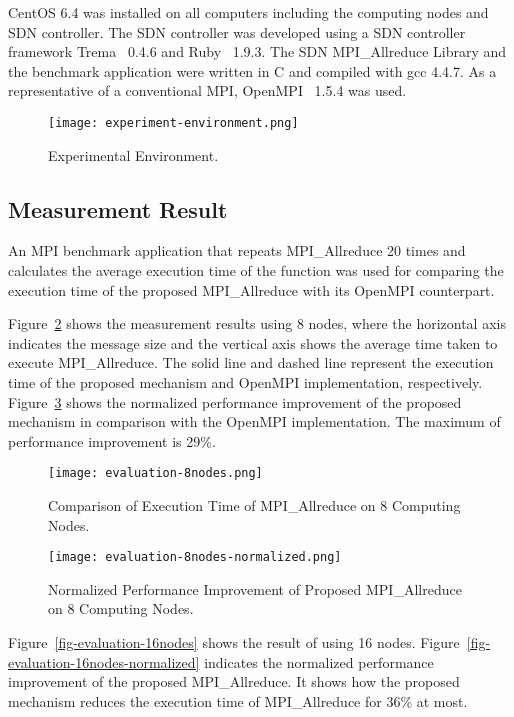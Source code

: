 CentOS 6.4 was installed on all computers including the computing nodes and
SDN controller. The SDN controller was developed using a SDN controller
framework Trema~\autocite{trema} 0.4.6 and Ruby~\autocite{ruby} 1.9.3. The SDN
MPI\_Allreduce Library and the benchmark application were written in C and
compiled with gcc 4.4.7. As a representative of a conventional MPI,
OpenMPI~\autocite{Gabriel2004} 1.5.4 was used.

\begin{figure}
    \centering
    \texttt{[image: experiment-environment.png]}
    \caption{Experimental Environment.}%
    \label{fig-experiment-environment}
\end{figure}

\subsection{Measurement Result}

An MPI benchmark application that repeats MPI\_Allreduce 20
times and calculates the average execution time of the function was used
for comparing the execution time of the proposed MPI\_Allreduce
with its OpenMPI counterpart.

Figure~\ref{fig-evaluation-8nodes} shows the measurement results using 8
nodes, where the horizontal axis indicates the message size and the
vertical axis shows the average time taken to execute
MPI\_Allreduce. The solid line and dashed line represent the
execution time of the proposed mechanism and OpenMPI implementation,
respectively. Figure~\ref{fig-evaluation-8nodes-normalized} shows the
normalized performance improvement of the proposed mechanism in
comparison with the OpenMPI implementation. The maximum of performance
improvement is 29\%.

\begin{figure}
    \centering
    \texttt{[image: evaluation-8nodes.png]}
    \caption{Comparison of Execution Time of MPI\_Allreduce on 8 Computing Nodes.}%
    \label{fig-evaluation-8nodes}
\end{figure}

\begin{figure}
    \centering
    \texttt{[image: evaluation-8nodes-normalized.png]}
    \caption{Normalized Performance Improvement of Proposed MPI\_Allreduce on 8 Computing Nodes.}%
    \label{fig-evaluation-8nodes-normalized}
\end{figure}

Figure~\ref{fig-evaluation-16nodes} shows the result of using 16 nodes.
Figure~\ref{fig-evaluation-16nodes-normalized} indicates the normalized
performance improvement of the proposed MPI\_Allreduce. It
shows how the proposed mechanism reduces the execution time of
MPI\_Allreduce for 36\% at most.

